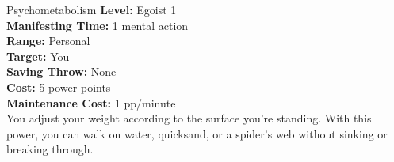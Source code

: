 {Psychometabolism}
{
	\textbf{Level:}
	Egoist 1\\
	\textbf{Manifesting Time:}
	1 mental action\\
	\textbf{Range:}
	Personal\\
	\textbf{Target:}
	You\\
	\textbf{Saving Throw:}
	None\\
	\textbf{Cost:}
	5 power points\\
	\textbf{Maintenance Cost:}
	1 pp/minute\\
}
{
	You adjust your weight according to the surface you're standing. With this power, you can walk on water, quicksand, or a spider's web without sinking or breaking through.
}